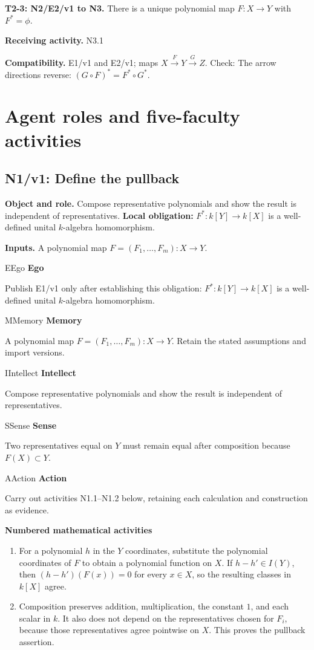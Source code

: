 \documentclass[preprint,12pt,aps,pra,showkeys,amsmath,amssymb,superscriptaddress,floatfix]{revtex4-2}
\theoremstyle{definition}
\theoremstyle{remark}
\newcommand{\mmfaculty}[3]{%
 \begin{mmfacultybox}{#1}{#2}
 {\sffamily\bfseries\color{MMBlue}#2}\par\smallskip #3
 \end{mmfacultybox}}
\newcommand{\field}[2]{\par\smallskip\noindent\textbf{#1.} #2\par}
\begin{document}
\field{T2-3: N2/E2/v1 to N3}{There is a unique polynomial map \(F:X\to Y\) with \(F^*=\phi\).}

\field{Receiving activity}{N3.1}

\field{Compatibility}{E1/v1 and E2/v1; maps \(X\xrightarrow{F}Y\xrightarrow{G}Z\). Check: The
arrow directions reverse: \((G\circ F)^*=F^*\circ G^*\).}

\endgroup

\clearpage\section{Agent roles and five-faculty activities}\begingroup\small\linespread{1.05}\selectfont{}

\subsection{N1/v1: Define the pullback}

\field{Object and role}{Compose representative polynomials and show the result is independent of
representatives. \textbf{Local obligation:} \(F^*:k[Y]\to k[X]\) is a
well-defined unital \(k\)-algebra homomorphism.}

\field{Inputs}{A polynomial map \(F=(F_1,\ldots,F_m):X\to Y\).}

\mmfaculty{E}{Ego}{Publish E1/v1 only after establishing this obligation:
\(F^*:k[Y]\to k[X]\) is a well-defined unital \(k\)-algebra
homomorphism.}

\mmfaculty{M}{Memory}{A polynomial map \(F=(F_1,\ldots,F_m):X\to Y\). Retain the stated
assumptions and import versions.}

\mmfaculty{I}{Intellect}{Compose representative polynomials and show the result is independent of
representatives.}

\mmfaculty{S}{Sense}{Two representatives equal on \(Y\) must remain equal after composition
because \(F(X)\subset Y\).}

\mmfaculty{A}{Action}{Carry out activities N1.1--N1.2 below, retaining each calculation and
construction as evidence.}

\smallskip\noindent\textbf{Numbered mathematical activities}

\begin{enumerate}[label=N1.\arabic*,leftmargin=3.4em]

\item For a polynomial \(h\) in the \(Y\) coordinates, substitute the
polynomial coordinates of \(F\) to obtain a polynomial function on
\(X\). If \(h-h'\in I(Y)\), then \((h-h')(F(x))=0\) for every
\(x\in X\), so the resulting classes in \(k[X]\) agree.

\item Composition preserves addition, multiplication, the constant \(1\), and
each scalar in \(k\). It also does not depend on the representatives
chosen for \(F_i\), because those representatives agree pointwise on
\(X\). This proves the pullback assertion.

\end{enumerate}
\end{document}
